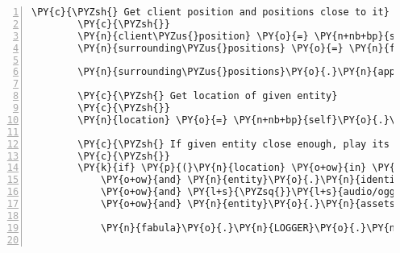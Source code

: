 \begin{Verbatim}[commandchars=\\\{\},numbers=left,firstnumber=1,stepnumber=1]
        \PY{c}{\PYZsh{} Get client position and positions close to it}
        \PY{c}{\PYZsh{}}
        \PY{n}{client\PYZus{}position} \PY{o}{=} \PY{n+nb+bp}{self}\PY{o}{.}\PY{n}{host}\PY{o}{.}\PY{n}{room}\PY{o}{.}\PY{n}{entity\PYZus{}locations}\PY{p}{[}\PY{n+nb+bp}{self}\PY{o}{.}\PY{n}{host}\PY{o}{.}\PY{n}{client\PYZus{}id}\PY{p}{]}
        \PY{n}{surrounding\PYZus{}positions} \PY{o}{=} \PY{n}{fabula}\PY{o}{.}\PY{n}{surrounding\PYZus{}positions}\PY{p}{(}\PY{n}{client\PYZus{}position}\PY{p}{)}

        \PY{n}{surrounding\PYZus{}positions}\PY{o}{.}\PY{n}{append}\PY{p}{(}\PY{n}{client\PYZus{}position}\PY{p}{)}

        \PY{c}{\PYZsh{} Get location of given entity}
        \PY{c}{\PYZsh{}}
        \PY{n}{location} \PY{o}{=} \PY{n+nb+bp}{self}\PY{o}{.}\PY{n}{host}\PY{o}{.}\PY{n}{room}\PY{o}{.}\PY{n}{entity\PYZus{}locations}\PY{p}{[}\PY{n}{entity}\PY{o}{.}\PY{n}{identifier}\PY{p}{]}

        \PY{c}{\PYZsh{} If given entity close enough, play its sound}
        \PY{c}{\PYZsh{}}
        \PY{k}{if} \PY{p}{(}\PY{n}{location} \PY{o+ow}{in} \PY{n}{surrounding\PYZus{}positions}
            \PY{o+ow}{and} \PY{n}{entity}\PY{o}{.}\PY{n}{identifier} \PY{o+ow}{is} \PY{o+ow}{not} \PY{n+nb+bp}{self}\PY{o}{.}\PY{n}{host}\PY{o}{.}\PY{n}{client\PYZus{}id}
            \PY{o+ow}{and} \PY{l+s}{\PYZsq{}}\PY{l+s}{audio/ogg}\PY{l+s}{\PYZsq{}} \PY{o+ow}{in} \PY{n}{entity}\PY{o}{.}\PY{n}{assets}\PY{o}{.}\PY{n}{keys}\PY{p}{(}\PY{p}{)}
            \PY{o+ow}{and} \PY{n}{entity}\PY{o}{.}\PY{n}{assets}\PY{p}{[}\PY{l+s}{\PYZsq{}}\PY{l+s}{audio/ogg}\PY{l+s}{\PYZsq{}}\PY{p}{]}\PY{o}{.}\PY{n}{data} \PY{o+ow}{is} \PY{o+ow}{not} \PY{n+nb+bp}{None}\PY{p}{)}\PY{p}{:}

            \PY{n}{fabula}\PY{o}{.}\PY{n}{LOGGER}\PY{o}{.}\PY{n}{debug}\PY{p}{(}\PY{l+s}{\PYZdq{}}\PY{l+s}{Playing Sound of: \PYZob{}\PYZcb{}}\PY{l+s}{\PYZdq{}}\PY{o}{.}\PY{n}{format}\PY{p}{(}\PY{n}{entity}\PY{o}{.}\PY{n}{identifier}\PY{p}{)}\PY{p}{)}


\end{Verbatim}
